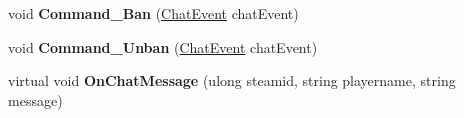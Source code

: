\begin{DoxyCompactItemize}
\item 
\hypertarget{class_s_e_mod_a_p_i_extensions_1_1_a_p_i_1_1_chat_manager_ab7448cfd69311a2db83115348e86dcef}{}void {\bfseries Command\+\_\+\+Ban} (\hyperlink{struct_s_e_mod_a_p_i_extensions_1_1_a_p_i_1_1_chat_manager_1_1_chat_event}{Chat\+Event} chat\+Event)\label{class_s_e_mod_a_p_i_extensions_1_1_a_p_i_1_1_chat_manager_ab7448cfd69311a2db83115348e86dcef}

\item 
\hypertarget{class_s_e_mod_a_p_i_extensions_1_1_a_p_i_1_1_chat_manager_abb83a76e97a7717a5d9dc4e4e97f7e66}{}void {\bfseries Command\+\_\+\+Unban} (\hyperlink{struct_s_e_mod_a_p_i_extensions_1_1_a_p_i_1_1_chat_manager_1_1_chat_event}{Chat\+Event} chat\+Event)\label{class_s_e_mod_a_p_i_extensions_1_1_a_p_i_1_1_chat_manager_abb83a76e97a7717a5d9dc4e4e97f7e66}

\item 
\hypertarget{class_s_e_mod_a_p_i_extensions_1_1_a_p_i_1_1_chat_manager_a0b40f857bbd93abd9067e447216dbfe6}{}virtual void {\bfseries On\+Chat\+Message} (ulong steamid, string playername, string message)\label{class_s_e_mod_a_p_i_extensions_1_1_a_p_i_1_1_chat_manager_a0b40f857bbd93abd9067e447216dbfe6}

\end{DoxyCompactItemize}
